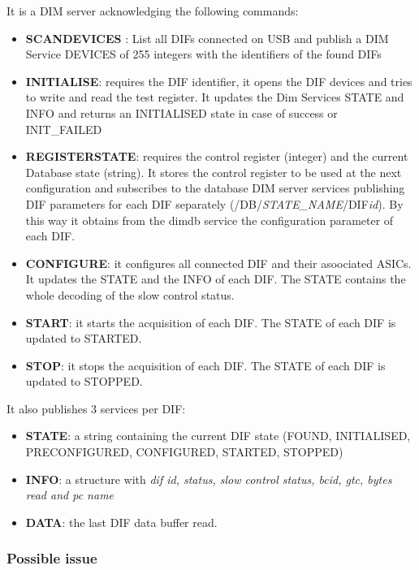 \documentclass[english]{article}
\begin{document}
It is a DIM server acknowledging the following commands:
\begin{itemize}
\item { \bf SCANDEVICES }: List all DIFs connected on USB and publish a DIM Service DEVICES of 255 integers with the identifiers of the found DIFs
\item {\bf INITIALISE}: requires the DIF identifier, it opens the DIF devices and tries to write and read the test register. It updates the Dim Services STATE and INFO and returns an INITIALISED state in case of success or INIT\_FAILED
\item {\bf REGISTERSTATE}: requires the control register (integer) and the current Database state (string). It stores the control register to be used at the next configuration and subscribes to the database DIM server services publishing DIF parameters for each DIF separately (/DB/{\sl STATE\_NAME}/DIF{\sl id}). By this way it obtains from the dimdb service the configuration parameter of each DIF.

\item {\bf CONFIGURE}: it configures all connected DIF and their asoociated ASICs. It updates the STATE and the INFO of each DIF. The STATE contains the whole decoding of the slow control status. 


\item {\bf START}: it starts the acquisition of each DIF. The STATE of each DIF is updated to STARTED.

\item {\bf STOP}: it stops the acquisition of each DIF. The STATE of each DIF is updated to STOPPED.

\end{itemize}

It also publishes 3 services per DIF:
\begin{itemize}
\item {\bf STATE}: a string containing the current DIF state (FOUND, INITIALISED, PRECONFIGURED, CONFIGURED, STARTED, STOPPED)

\item {\bf INFO}: a structure with {\sl dif id, status, slow control status, bcid, gtc,  bytes read and pc name}

\item {\bf DATA}: the last DIF data buffer read. 
\end{itemize}

\subsubsection{Possible issue}
\end{document}
